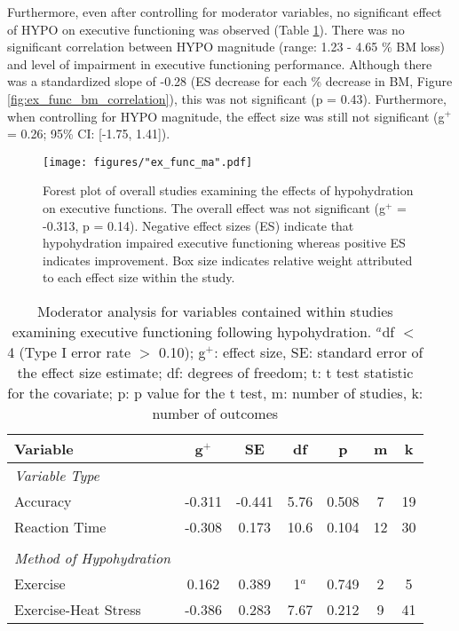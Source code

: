 Furthermore, even after controlling for moderator variables, no significant effect of HYPO on executive functioning was observed (Table \ref{tbl:ex_func_moderators}). There was no significant correlation between HYPO magnitude (range: 1.23 - 4.65 \% BM loss) and level of impairment in executive functioning performance. Although there was a standardized slope of -0.28 (ES decrease for each \% decrease in BM, Figure \ref{fig:ex_func_bm_correlation}), this was not significant (p = 0.43). Furthermore, when controlling for HYPO magnitude, the effect size was still not significant (g${^+}$ = 0.26; 95\% CI: [-1.75, 1.41]).


\begin{figure}
	\texttt{[image: figures/"ex\_func\_ma".pdf]}
	\caption{Forest plot of overall studies examining the effects of hypohydration on executive functions. The overall effect was not significant (g${^+}$ = -0.313, p = 0.14). Negative effect sizes (ES) indicate that hypohydration impaired executive functioning whereas positive ES indicates improvement. Box size indicates relative weight attributed to each effect size within the study.}
	\label{fig:ex_func_ma}
\end{figure}

\begin{table}
	\caption{Moderator analysis for variables contained within studies examining executive functioning following hypohydration. ${^a}$df ${<}$ 4 (Type I error rate ${>}$ 0.10); g${^+}$: effect size, SE: standard error of the effect size estimate; df: degrees of freedom; t: t test statistic for the covariate; p: p value for the t test, m: number of studies, k: number of outcomes}
	\centering
	\begin{tabular}{lcccccc} 
		\hline
		\textbf{Variable} & \textbf{g${^+}$} & \textbf{SE} & \textbf{df} & \textbf{p} & \textbf{m} & 
		\textbf{k} \\
		\hline
		\textit{Variable Type} &&&&&& \\
		Accuracy & -0.311 & -0.441 & 5.76 & 0.508 & 7 & 19 \\
		Reaction Time & -0.308 & 0.173 & 10.6 & 0.104 & 12 & 30 \\
		&&&&&& \\
		\textit{Method of Hypohydration} &&&&&& \\
		Exercise & 0.162 & 0.389 & 1${^a}$ & 0.749 & 2 & 5 \\
		Exercise-Heat Stress & -0.386 & 0.283 & 7.67 & 0.212 & 9 & 41 \\
		\hline		    
	\end{tabular}
	\label{tbl:ex_func_moderators}
\end{table}

